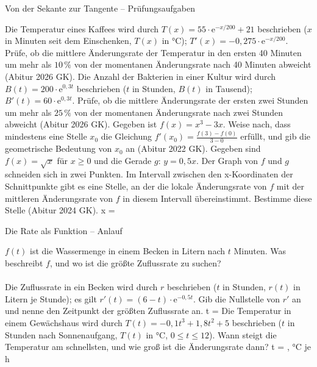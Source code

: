 \begin{aufgabe}{Von der Sekante zur Tangente – Prüfungsaufgaben}
\begin{teile}
\teil Die Temperatur eines Kaffees wird durch $T(x) = 55 \cdot \mathrm{e}^{-x/200} + 21$ beschrieben ($x$ in Minuten seit dem Einschenken, $T(x)$ in °C); $T'(x) = -0{,}275 \cdot \mathrm{e}^{-x/200}$. Prüfe, ob die mittlere Änderungsrate der Temperatur in den ersten 40 Minuten um mehr als $10\,\%$ von der momentanen Änderungsrate nach 40 Minuten abweicht \hfill (Abitur 2026 GK).
\teil Die Anzahl der Bakterien in einer Kultur wird durch $B(t) = 200 \cdot \mathrm{e}^{0{,}3t}$ beschrieben ($t$ in Stunden, $B(t)$ in Tausend); $B'(t) = 60 \cdot \mathrm{e}^{0{,}3t}$. Prüfe, ob die mittlere Änderungsrate der ersten zwei Stunden um mehr als $25\,\%$ von der momentanen Änderungsrate nach zwei Stunden abweicht \hfill (Abitur 2026 GK).
\teil Gegeben ist $f(x) = x^3 - 3x$. Weise nach, dass mindestens eine Stelle $x_0$ die Gleichung $f'(x_0) = \frac{f(3) - f(0)}{3 - 0}$ erfüllt, und gib die geometrische Bedeutung von $x_0$ an \hfill (Abitur 2022 GK).
\teil Gegeben sind $f(x) = \sqrt{x}$ für $x \ge 0$ und die Gerade $g$: $y = 0{,}5x$. Der Graph von $f$ und $g$ schneiden sich in zwei Punkten. Im Intervall zwischen den x-Koordinaten der Schnittpunkte gibt es eine Stelle, an der die lokale Änderungsrate von $f$ mit der mittleren Änderungsrate von $f$ in diesem Intervall übereinstimmt. Bestimme diese Stelle \hfill (Abitur 2024 GK). x = \leerfeld
\end{teile}
\end{aufgabe}

\begin{aufgabe}{Die Rate als Funktion – Anlauf}
\begin{teile}
\teil $f(t)$ ist die Wassermenge in einem Becken in Litern nach $t$ Minuten. Was beschreibt $f$, und wo ist die größte Zuflussrate zu suchen? \\  \\ 
\teil Die Zuflussrate in ein Becken wird durch $r$ beschrieben ($t$ in Stunden, $r(t)$ in Litern je Stunde); es gilt $r'(t) = (6 - t) \cdot \mathrm{e}^{-0{,}5t}$. Gib die Nullstelle von $r'$ an und nenne den Zeitpunkt der größten Zuflussrate an. t = \leerfeld
\teil Die Temperatur in einem Gewächshaus wird durch $T(t) = -0{,}1t^3 + 1{,}8t^2 + 5$ beschrieben ($t$ in Stunden nach Sonnenaufgang, $T(t)$ in °C, $0 \le t \le 12$). Wann steigt die Temperatur am schnellsten, und wie groß ist die Änderungsrate dann? t = \leerfeld , \leerfeld °C je h
\end{teile}
\end{aufgabe}

